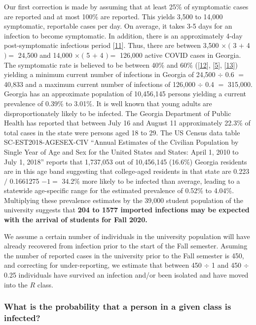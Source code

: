 \documentclass[
]{article}
\begin{document}
Our first correction is made by assuming that at least 25\% of
symptomatic cases are reported and at most 100\% are reported. This
yields 3,500 to 14,000 symptomatic, reportable cases per day. On
average, it takes 3-5 days for an infection to become symptomatic. In
addition, there is an approximately 4-day post-symptomatic infectious
period {[}\protect\hyperlink{ref-He2020-pq}{11}{]}. Thus, there are
between 3,500 \(\times~(\) 3 \(+\) 4 \() =\) 24,500 and 14,000
\(\times~(\) 5 \(+\) 4 \() =\) 126,000 active COVID cases in Georgia.
The symptomatic rate is believed to be between 40\% and 60\%
({[}\protect\hyperlink{ref-Pollan2020-xb}{12}{]},
{[}\protect\hyperlink{ref-Oran2020-aq}{5}{]},
{[}\protect\hyperlink{ref-Mizumoto2020-qc}{13}{]}) yielding a minimum
current number of infections in Georgia of 24,500 \(\div\) 0.6 \(=\)
40,833 and a maximum current number of infections of 126,000 \(\div\)
0.4 \(=\) 315,000. Georgia has an approximate population of 10,456,145
persons yielding a current prevalence of 0.39\% to 3.01\%. It is well
known that young adults are disproportionately likely to be infected.
The Georgia Department of Public Health has reported that between July
16 and August 11 approximately 22.3\% of total cases in the state were
persons aged 18 to 29. The US Census data table SC-EST2018-AGESEX-CIV
``Annual Estimates of the Civilian Population by Single Year of Age and
Sex for the United States and States: April 1, 2010 to July 1, 2018''
reports that 1,737,053 out of 10,456,145 (16.6\%) Georgia residents are
in this age band suggesting that college-aged residents in that state
are 0.223 \(/\) 0.1661275 \(-1=\) 34.2\% more likely to be infected than
average, leading to a statewide age-specific range for the estimated
prevalence of 0.52\% to 4.04\%. Multiplying these prevalence estimates
by the 39,000 student population of the university suggests that
\textbf{204 to 1577 imported infections may be expected with the arrival
of students for Fall 2020.}

We assume a certain number of individuals in the university population
will have already recovered from infection prior to the start of the
Fall semester. Asuming the number of reported cases in the university
prior to the Fall semester is 450, and correcting for under-reporting,
we estimate that between 450 \(\div\) 1 and 450 \(\div\) 0.25
individuals have survived an infection and/or been isolated and have
moved into the \(R\) class.

\hypertarget{what-is-the-probability-that-a-person-in-a-given-class-is-infected}{%
\subsubsection{What is the probability that a person in a given class is
infected?}\label{what-is-the-probability-that-a-person-in-a-given-class-is-infected}}
\end{document}
